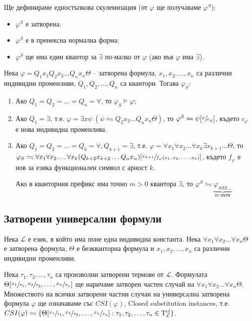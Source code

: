 \documentclass{article}
\newcommand{\Tau}{\mathrm{T}}
\begin{document}
\begin{mydef}
Ще дефинираме едностъпкова скулемизация (от $\varphi$ ще получаваме $\varphi^S$):
\begin{itemize}
\item $\varphi^S$ е затворена;
\item $\varphi^S$ е в пренексна нормална форма;
\item $\varphi^S$ ще има един квантор за $\exists$ по-малко от $\varphi$ (ако във $\varphi$ има $\exists$).
\end{itemize}

Нека $\varphi = Q_1x_1Q_2x_2\ldots Q_nx_n\Theta$ -- затворена формула, $x_1, x_2, \ldots, x_n$ са различни индивидни променливи, $Q_1, Q_2, \ldots, Q_n$ са квантори. Тогава $\varphi_S$:
\begin{enumerate}
\item Ако $Q_1 = Q_2 = \ldots = Q_n = \forall$, то $\varphi_S \models \varphi$;
\item Ако $Q_1 = \exists$, т.е. $\varphi = \exists x\psi\ (\psi \leftrightharpoons Q_2x_2\ldots Q_nx_n\Theta)$, то $\varphi^S \leftrightharpoons \psi[\sfrac{x}{c_\varphi}]$, където $c_\varphi$ е нова индивидна променлива.
\item Ако $Q_1 = Q_2 = \ldots = Q_k = \forall, Q_{k+1} = \exists$, т.е. $\varphi = \forall x_1\forall x_2\ldots\forall x_k\exists x_{k+1}\ldots\Theta$, то $\\ \varphi_S \leftrightharpoons \forall x_1\forall x_2\ldots\forall x_k(Q_{k+2}x_{k+2}\ldots Q_nx_n)[\sfrac{x_{k+1}}{f_\varphi(x_1, x_2,\ldots, x_k)}]$, където $f_\varphi$ е нов за езика функционален символ с арност $k$.

Ако в кванторния префикс има точно $m>0$ квантора $\exists$, то $\varphi^S \leftrightharpoons \underbrace{\varphi_{SSS\ldots}}_{\text{m пъти}}$
\end{enumerate}
\end{mydef}

\subsection*{Затворени универсални формули}

\begin{mydef}
Нека $\mathcal{L}$ е език, в който има поне една индивидна константа. Нека $\forall x_1\forall x_2\ldots \forall x_n\Theta$ е затворена формула, $\Theta$ е безкванторна формула и $x_1, x_2, \ldots, x_n$ са различни индивидни променливи.

Нека $\tau_1, \tau_2, \ldots, \tau_n$ са произволни затворени термове от $\mathcal{L}$. Формулата $\Theta[\sfrac{x_1}{\tau_1}, \sfrac{x_2}{\tau_2}, \ldots, \sfrac{x_n}{\tau_n}]$ ще наричаме затворен частен случай на $\forall x_1\forall x_2\ldots\forall x_n\Theta$. Множеството на всички затворени частни случаи на универсална затворена формула $\varphi$ ще означаваме със $CSI(\varphi)$, Closed substitution instances, т.е. $CSI(\varphi) \leftrightharpoons \{\Theta[\sfrac{x_1}{\tau_1}, \sfrac{x_2}{\tau_2}, \ldots, \sfrac{x_n}{\tau_n}] : \tau_1, \tau_2, \ldots, \tau_n \in \Tau^{cl}_\mathcal{L}\}$.
\end{mydef}
\end{document}
